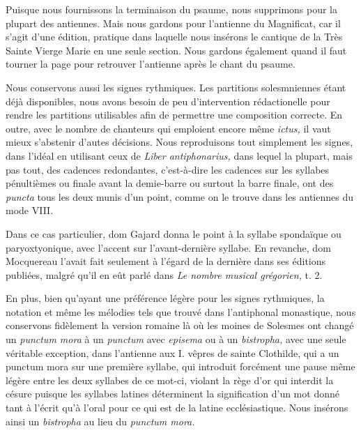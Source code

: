 \begin{frpars}
Puisque nous fournissons la terminaison du psaume, nous supprimons  pour la plupart des antiennes. Mais nous gardons  pour l'antienne du Magnificat, car il s'agit d'une édition, pratique dans laquelle nous insérons le cantique de la Très Sainte Vierge Marie en une seule section. Nous gardons également  quand il faut tourner la page pour retrouver l'antienne après le chant du psaume.


Nous conservons aussi les signes rythmiques. Les partitions solesmniennes étant déjà disponibles, nous avons besoin de peu d'intervention rédactionelle pour rendre les partitions utilisables afin de permettre une composition correcte. En outre, avec le nombre de chanteurs qui emploient encore même \textit{ictus,} il vaut mieux s'abstenir d'autes décisions. Nous reproduisons tout simplement les signes, dans l'idéal en utilisant ceux de \textit{Liber antiphonarius,} dans lequel la plupart, mais pas tout, des cadences redondantes, c’est-à-dire les cadences sur les syllabes pénultièmes ou finale avant la demie-barre ou surtout la barre finale, ont des \textit{puncta} tous les deux munis d'un point, comme on le trouve dans les antiennes du mode VIII.

Dans ce cas particulier, dom Gajard donna le point à la syllabe spondaïque ou paryoxtyonique, avec l'accent sur l'avant-dernière syllabe. En revanche, dom Mocquereau l'avait fait seulement à l'égard de la dernière dans ses éditions publiées, malgré qu'il en eût parlé dans \textit{Le nombre musical grégorien,} t. 2.

En plus, bien qu'ayant une préférence légère pour les signes rythmiques, la notation et même les mélodies tels que trouvé dans l'antiphonal monastique, nous conservons fidèlement la version romaine là où les moines de Solesmes ont changé un \textit{punctum mora} à un \textit{punctum} avec \textit{episema} ou à un \textit{bistropha,} avec une seule véritable exception, dans l'antienne aux I. vêpres de sainte Clothilde, qui a un punctum mora sur une première syllabe, qui introduit forcément une pause même légère entre les deux syllabes de ce mot-ci, violant la rège d'or qui interdit la césure puisque les syllabes latines déterminent la signification d'un mot donné tant à l'écrit qu'à l'oral pour ce qui est de la latine ecclésiastique. Nous insérons ainsi un \textit{bistropha} au lieu du \textit{punctum mora.}


\end{frpars}
